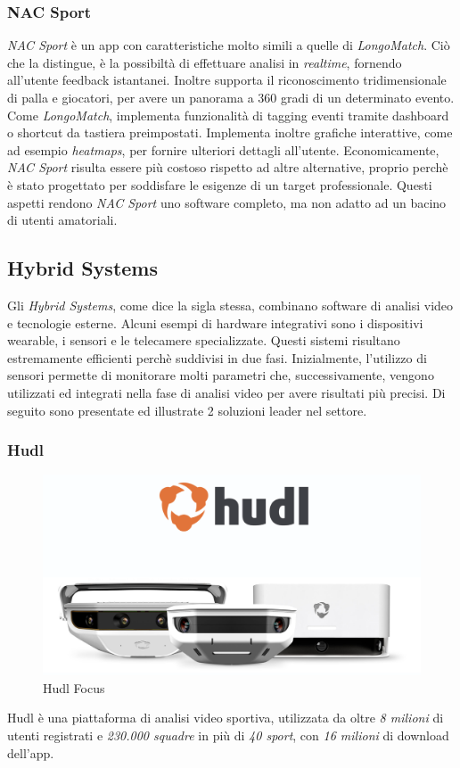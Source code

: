 \subsubsection{NAC Sport}
\textit{NAC Sport} \cite{NacSport} è un app con caratteristiche molto simili a quelle di \textit{LongoMatch}. Ciò che la distingue, è la possibiltà di effettuare analisi in \textit{realtime}, fornendo all'utente feedback istantanei. Inoltre supporta il riconoscimento tridimensionale di palla e giocatori, per avere un panorama a 360 gradi di un determinato evento. Come \textit{LongoMatch}, implementa funzionalità di tagging eventi tramite dashboard o shortcut da tastiera preimpostati. Implementa inoltre grafiche interattive, come ad esempio \textit{heatmaps}, per fornire ulteriori dettagli all'utente. Economicamente, \textit{NAC Sport} risulta essere più costoso rispetto ad altre alternative, proprio perchè è stato progettato per soddisfare le esigenze di un target professionale. Questi aspetti rendono \textit{NAC Sport} uno software completo, ma non adatto ad un bacino di utenti amatoriali.

\pagebreak

\subsection{Hybrid Systems}
Gli \textit{Hybrid Systems}, come dice la sigla stessa, combinano software di analisi video e tecnologie esterne. Alcuni esempi di hardware integrativi sono i dispositivi wearable, i sensori e le telecamere specializzate. Questi sistemi risultano estremamente efficienti perchè suddivisi in due fasi. Inizialmente, l'utilizzo di sensori permette di monitorare molti parametri che, successivamente, vengono utilizzati ed integrati nella fase di analisi video per avere risultati più precisi. 
\noindent Di seguito sono presentate ed illustrate 2 soluzioni leader nel settore.

\subsubsection{Hudl}
\label{subsubsec:hudl}
\begin{figure}
    \centering
    \includegraphics[scale=0.4]{img/hudl_focus.png}
    \caption{Hudl Focus}
    \label{fig:Hudl Focus}
\end{figure}
Hudl \cite{Hudl} è una piattaforma di analisi video sportiva, utilizzata da oltre \textit{8 milioni} di utenti registrati e \textit{230.000 squadre} in più di \textit{40 sport}, con \textit{16 milioni} di download dell'app.


